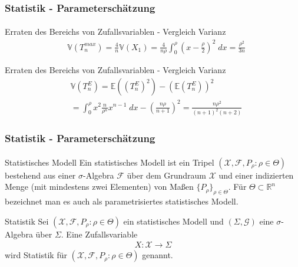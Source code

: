 \documentclass{beamer}
\begin{document}
\begin{frame}
    \frametitle{Statistik - Parameterschätzung}
\framesubtitle{}

\begin{block}{Erraten des Bereichs von Zufallsvariablen - Vergleich Varianz}
\begin{align*}
& \mathbb{V}(T_n^{max} ) = \frac{4}{n} \mathbb{V}(X_1)   =  \frac{4}{n \rho}   \int_{0}^{\rho } (x - \frac{\rho}{2})^2 \; dx = \frac{\rho^2}{3n}
\end{align*}
\end{block}
\begin{block}{Erraten des Bereichs von Zufallsvariablen - Vergleich Varianz}
\begin{align*}
& \mathbb{V}(T_n^{E} ) = \mathbb{E}((T_n^{E})^2 ) - (\mathbb{E}(T_n^{E} ))^2   \\
& = \int_{0}^{\rho} x^2 \frac{n}{\rho^n} x^{n- 1} \; dx - (\frac{n \rho}{n+1})^2 = \frac{n \rho^2}{(n+1)^2 (n+2)} 
\end{align*}
\end{block}
 \end{frame}







\begin{frame}
    \frametitle{Statistik - Parameterschätzung}
\framesubtitle{}

\begin{block}{Statistisches Modell}
Ein statistisches Modell ist ein Tripel $(\mathcal{X}, \mathcal{F}, P_\rho :  \rho \in \Theta)$ bestehend aus einer $\sigma$-Algebra $\mathcal{F}$ über dem Grundraum $\mathcal{X}$ und einer indizierten Menge (mit mindestens zwei Elementen) von Maßen $\{ P_\rho\}_{\rho \in \Theta}$. Für $\Theta \subset \mathbb{R}^n$ bezeichnet man es auch als parametrisiertes statistisches Modell. 
\end{block}

\begin{block}{Statistik}
Sei   $(\mathcal{X}, \mathcal{F}, P_\rho :  \rho \in\Theta)$ ein statistisches Modell und $(\Sigma, \mathcal{G})$ eine $\sigma$-Algebra über $\Sigma$. Eine Zufallsvariable 
\begin{align*}
X : \mathcal{X} \to \Sigma
\end{align*}
wird Statistik für  $(\mathcal{X}, \mathcal{F}, P_\rho :  \rho \in \Theta)$  genannt.
\end{block}
 \end{frame}
\end{document}
